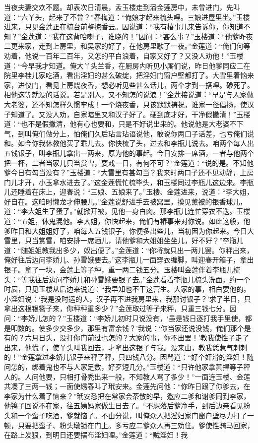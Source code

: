 当夜夫妻交欢不题。却表次日清晨，孟玉楼走到潘金莲房中，未曾进门，先叫道：“六丫头，起来了不曾？”春梅道：“俺娘才起来梳头哩。三娘进屋里坐。”玉楼进来，只见金莲正在梳台前整掠香云。因说道：“我有椿事儿来告诉你，你知道不知？”金莲道：“我在这背哈喇子，谁晓的！”因问：“甚么事？”玉楼道：“他爹昨夜二更来家，走到上房里，和吴家的好了，在他房里歇了一夜。”金莲道：“俺们何等劝着，他说一百年二百年，又怎的平白浪着，自家又好了？又没人劝他！”玉楼道：“今早我才知道。俺大丫头兰香，在厨房内听见小厮们说，昨日他爹同应二在院里李桂儿家吃酒，看出淫妇的甚么破绽，把淫妇门窗户壁都打了。大雪里着恼来家，进仪门，看见上房烧夜香，想必听见些甚么话儿，两个才到一搭哩。碜死了。相他这等就没的话说。若是别人，又不知怎的说浪！”金莲接说道：“早是与人家做大老婆，还不知怎样久惯牢成！一个烧夜香，只该默默祷祝，谁家一径倡扬，使汉子知道了。又没人劝，自家暗里又和汉子好了。硬到底才好，干净假撇清！”玉楼道：“也不是假撇清，他有心也要和，只是不好说出来的。他说他是大老婆不下气，到叫俺们做分上，怕俺们久后玷言玷语说他，敢说你两口子话差，也亏俺们说和。如今你我休教他买了乖儿去。你快梳了头，过去和李瓶儿说去。咱两个每人出五钱银子，叫李瓶儿拿出一两来，原为他的事起。今日安排一席酒，一者与他两个把一杯，二者当家儿只当赏雪，耍戏一日，有何不可？”金莲道：“说的是。不知他爹今日有勾当没有？”玉楼道：“大雪里有甚勾当？我来时两口子还不见动静，上房门儿才开，小玉拿水进去了。”这金莲慌忙梳毕头，和玉楼同过李瓶儿这边来。李瓶儿还睡着在床上，迎春说：“三娘、五娘来了。”玉楼、金莲进来，说道：“李大姐，好自在。这咱时懒龙才伸腰儿。”金莲说舒进手去被窝里，摸见薰被的银香球儿，道：“李大姐生了蛋了。”就掀开被，见他一身白肉。那李瓶儿连忙穿衣不迭。玉楼道：“五姐，休鬼混他。李大姐，你快起来，俺们有椿事来对你说。如此这般，他爹昨日和大姐姐好了，咱每人五钱银子，你便多出些儿，当初因为你起来。今日大雪里，只当赏雪，咱安排一席酒儿，请他爹和大姐姐坐坐儿，好不好？”李瓶儿道：“随姐姐教我出多少，奴出便了。”金莲道：“你将就只出一两儿罢。你秤出来，俺好往后边问李娇儿、孙雪娥要去。”这李瓶儿一面穿衣缠脚，叫迎春开箱子，拿出银子。拿了一块，金莲上等子秤，重一两二钱五分。玉楼叫金莲伴着李瓶儿梳头：“等我往后边问李娇儿和孙雪娥要银子去。”金莲看着李瓶儿梳头洗面，约一个时辰，只见玉楼从后边来说道：“我早知也不干这营生。大家的事，相白要他的。小淫妇说：‘我是没时运的人，汉子再不进我房里来，我那讨银子？’求了半日，只拿出这根银簪子来，你秤秤重多少？”金莲取过等子来秤，只重三钱七分。因问：“李娇儿怎的？”玉楼道：“李娇儿初时只说没有，‘虽是钱日逐打我手里使，都是叩数的。使多少交多少，那里有富余钱？’我说：‘你当家还说没钱，俺们那个是有的？六月日头，没打你门前过也怎的？大家的事，你不出罢！’教我使性子走了出来，他慌了，使丫头叫我回去，才拿出这银子与我。没来由，教我恁惹气剌剌的！”金莲拿过李娇儿银子来秤了秤，只四钱八分。因骂道：“好个奸滑的淫妇！随问怎的，绑着鬼也不与人家足数，好歹短几分。”玉楼道：“只许他家拿黄捍等子秤人的。人问他要，只相打骨秃出来一般，不知教人骂了多少！”一面连玉楼、金莲共凑了三两一钱；一面使绣春叫了玳安来。金莲先问他：“你昨日跟了你爹去，在李家为什么着了恼来？”玳安悉把在常家会茶散的早，邀应二爹和谢爹同到李家，他鸨子回说不在家，往五姨妈家做生日去了。“不想落后爹净手，到后边亲看见粉头和一个蛮子吃酒，爹就恼了。不由分说，叫俺众人把淫妇家门窗户壁尽力打了一顿，只要把蛮子、粉头墩锁在门上。多亏应二爹众人再三劝住。爹使性骑马回家，在路上发狠，到明日还要摆布淫妇哩。”金莲道：“贼淫妇！我